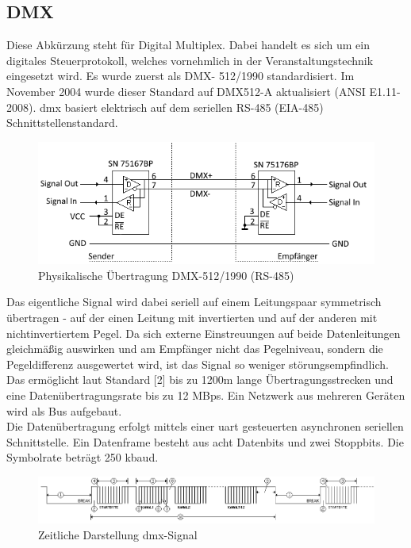 \documentclass[11pt]{scrartcl}
\begin{document}
\subsection{DMX}
Diese Abkürzung steht für Digital Multiplex. Dabei handelt es sich um ein digitales Steuerprotokoll,
welches vornehmlich in der Veranstaltungstechnik eingesetzt wird. Es wurde zuerst als DMX-
512/1990 standardisiert. Im November 2004 wurde dieser Standard auf DMX512-A aktualisiert
(ANSI E1.11-2008). \ac{dmx} basiert elektrisch auf dem seriellen RS-485 (EIA-485)
Schnittstellenstandard.
\begin{figure}[H]
    \begin{center}
        \includegraphics[width=.75\textwidth]{images/dmx.png}
    \end{center}
    \caption{Physikalische Übertragung DMX-512/1990 (RS-485) \cite{soundlight}}
\end{figure}
\noindent
Das eigentliche Signal wird dabei seriell auf einem Leitungspaar symmetrisch übertragen - auf der
einen Leitung mit invertierten und auf der anderen mit nichtinvertiertem Pegel. Da sich externe 
Einstreuungen auf beide Datenleitungen gleichmäßig auswirken und am Empfänger nicht das Pegelniveau,
sondern die Pegeldifferenz ausgewertet wird, ist das Signal so weniger störungsempfindlich.
Das ermöglicht laut Standard [2] bis zu 1200m lange Übertragungsstrecken und eine
Datenübertragungsrate bis zu 12 \ac{MBps}. Ein Netzwerk aus mehreren Geräten wird als Bus aufgebaut.\\
Die Datenübertragung erfolgt mittels einer \ac{uart} gesteuerten asynchronen seriellen Schnittstelle. Ein
Datenframe besteht aus acht Datenbits und zwei Stoppbits. Die Symbolrate beträgt 250 k\ac{baud}.
\begin{figure}[H]
    \includegraphics[width=\textwidth]{images/DMX_zeitlich.png}
    \caption{Zeitliche Darstellung \ac{dmx}-Signal \cite{soundlightA}} \label{fig:DMXoverTime}
\end{figure}
\end{document}
